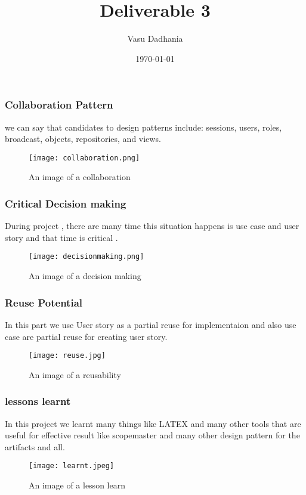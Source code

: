 \documentclass{beamer}
\begin{document}
\title{Deliverable 3}
\author{Vasu Dadhania}
\date{\today} 
\frame{\titlepage} 




\begin{frame}
\frametitle{Collaboration Pattern}


we can say that candidates to design patterns include: sessions, users, roles, broadcast, objects, repositories, and views.



\begin{figure}[htp]
    \centering
    \texttt{[image: collaboration.png]}
    \caption{An image of a collaboration}
    \label{fig:collaboration}
\end{figure}

\end{frame}

\begin{frame}
\frametitle{Critical Decision making}
During project , there are many time this situation happens is use case and user story and that time is critical .

\begin{figure}[htp]
    \centering
    \texttt{[image: decisionmaking.png]}
    \caption{An image of a decision making}
    \label{fig:collaboration}
\end{figure}
 
\end{frame}







\begin{frame}
\frametitle{Reuse Potential}
In this part we use User story as a partial reuse for implementaion and also use case are partial reuse for creating user story.
 

\begin{figure}[htp]
    \centering
    \texttt{[image: reuse.jpg]}
    \caption{An image of a reusability}
    \label{fig:collaboration}
\end{figure}
 
\end{frame}


\begin{frame}
\frametitle{ lessons learnt }

In this project we learnt many things like LATEX and many other tools that are useful for effective result like scopemaster and many other design pattern for the artifacts and all.

\begin{figure}[htp]
    \centering
    \texttt{[image: learnt.jpeg]}
    \caption{An image of a lesson learn}
    \label{fig:collaboration}
\end{figure}
 
\end{frame}
\end{document}
